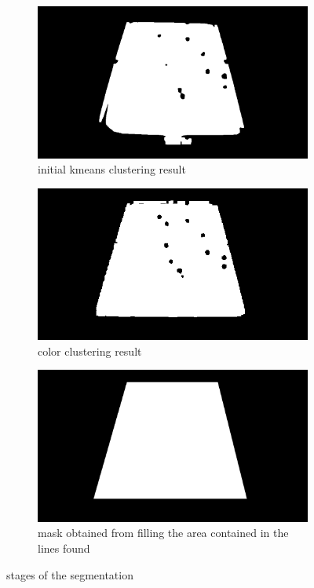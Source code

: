 \begin{figure}[h]
    \centering
    \begin{subfigure}[b]{0.4\textwidth}
    \includegraphics[width=\textwidth]{./imgs/kmeans_cluster.png}
    \caption{initial kmeans clustering result}
    \label{fig:kmeanstabol}
    \end{subfigure}
    \centering
    \begin{subfigure}[b]{0.4\textwidth}

    \includegraphics[width=\textwidth]{./imgs/color_cluster.png}
    \caption{color clustering result}
    \label{fig:colorsegtabol}
    \end{subfigure}
    \vspace{30}
    \begin{subfigure}[b]{0.4\textwidth}

    \includegraphics[width=\textwidth]{./imgs/maskfill.png}
    \caption{mask obtained from filling the area contained in the lines found}
    \label{fig:finalsegtabol}
    \end{subfigure}
    \caption{stages of the segmentation}
    \vspace{30}
\end{figure}
